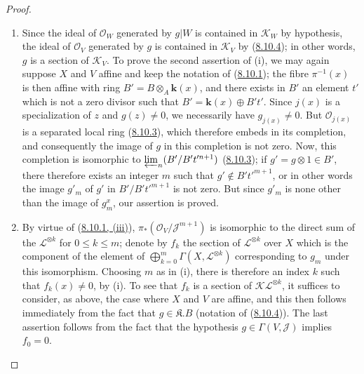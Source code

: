 \begin{proof}
\begin{enumerate}
  \item[\rm{(i)}] Since the ideal of $\mathcal{O}_W$ generated by $g|W$ is
  contained in $\mathcal{K}_W$ by hypothesis, the ideal of $\mathcal{O}_V$
  generated by $g$ is contained in $\mathcal{K}_V$ by
  (\hyperref[II.8.10.4]{8.10.4}); in other words, $g$ is a section of
  $\mathcal{K}_V$. To prove the second assertion of (i), we may again
  suppose $X$ and $V$ affine and keep the notation of
  (\hyperref[II.8.10.1]{8.10.1}); the fibre $\pi^{-1}(x)$ is then affine
  with ring $B'=B\otimes_A \boldsymbol{k}(x)$, and there exists in $B'$ an element $t'$
  which is not a zero divisor such that $B'=\boldsymbol{k}(x)\oplus B't'$. Since $j(x)$ is a
  specialization of $z$ and $g(z)\neq0$, we necessarily have
  $g_{j(x)}\neq0$. But $\mathcal{O}_{j(x)}$ is a separated local ring
  (\hyperref[II.8.10.3]{8.10.3}), which therefore embeds in its completion,
  and consequently the image of $g$ in this completion is not zero. Now, this
  completion is isomorphic to $\varprojlim_n(B'/B't'^{n+1})$
  (\hyperref[II.8.10.3]{8.10.3}); if $g'=g\otimes1\in B'$, there therefore
  exists an integer $m$ such that $g'\notin B't'^{m+1}$, or in other words
  the image $g'_m$ of $g'$ in $B'/B't'^{m+1}$ is not zero. But since $g'_m$ is
  none other than the image of $g_m^x$, our assertion is proved.
  \item[\rm{(ii)}] By virtue of
  (\hyperref[II.8.10.1]{8.10.1, (iii)}),
  $\pi_*(\mathcal{O}_V/\mathcal{J}^{m+1})$ is isomorphic to the direct sum
  of the $\mathcal{L}^{\otimes k}$ for $0\leqslant k\leqslant m$; denote
  by $f_k$ the section of $\mathcal{L}^{\otimes k}$ over $X$ which is the
  component of the element of
  $\bigoplus_{k=0}^m\Gamma(X,\mathcal{L}^{\otimes k})$ corresponding to $g_m$
  under this isomorphism. Choosing $m$ as in (i), there is therefore an index
  $k$ such that $f_k(x)\neq0$, by (i). To see that $f_k$ is a section
  of $\mathcal{K}\mathcal{L}^{\otimes k}$, it suffices to consider, as
  above, the case where $X$ and $V$ are affine, and this then follows
  immediately from the fact that $g\in\mathfrak{K}.B$ (notation of
  (\hyperref[II.8.10.4]{8.10.4})). The last assertion follows from the fact
  that the hypothesis $g\in\Gamma(V,\mathcal{J})$ implies $f_0=0$.
\end{enumerate}
\end{proof}

